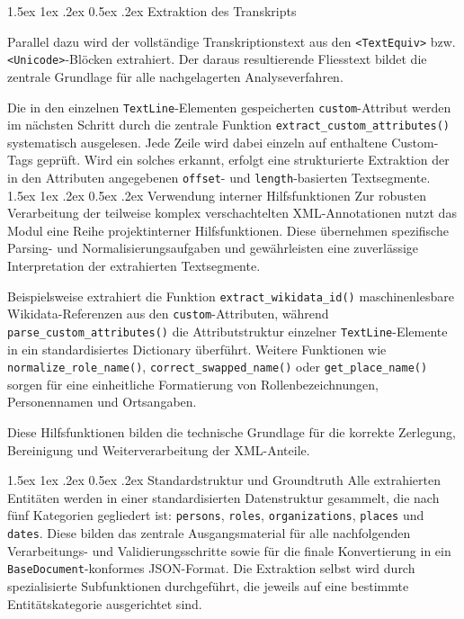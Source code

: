 \documentclass[12pt, a4paper, ngerman, bidi=default]{article}
\makeatletter
\newcommand{\code}[1]{\colorbox{VeryLightGray}{\texttt{#1}}} %
\let\oldparagraph\paragraph%
\renewcommand{\paragraph}{
    \@ifstar%
      \xxxParagraphStar%
      \xxxParagraphNoStar%
 }
\newcommand{\xxxParagraphStar}[1]{\oldparagraph*{#1}\mbox{}}
\newcommand{\xxxParagraphNoStar}[1]{\oldparagraph{#1}\mbox{}}
\renewcommand\paragraph{\@startsection{paragraph}{4}{0em}%
  {1.5ex \@plus1ex \@minus.2ex}%
  {0.5ex \@plus.2ex}%
  {\normalfont\normalsize\bfseries\itshape}}
\makeatother
\begin{document}
\paragraph{Extraktion des Transkripts}

Parallel dazu wird der vollständige Transkriptionstext aus den \code{<TextEquiv>} bzw. \code{<Unicode>}-Blöcken extrahiert. Der daraus resultierende Fliesstext bildet die zentrale Grundlage für alle nachgelagerten Analyseverfahren. 

Die in den einzelnen \code{TextLine}-Elementen gespeicherten \code{custom}-Attribut   werden im nächsten Schritt durch die zentrale Funktion \code{extract\_custom\_attributes()} systematisch ausgelesen. Jede Zeile wird dabei einzeln auf enthaltene Custom-Tags geprüft. Wird ein solches erkannt, erfolgt eine strukturierte Extraktion der in den Attributen angegebenen \code{offset}- und \code{length}-basierten Textsegmente.
\paragraph{Verwendung interner Hilfsfunktionen}
Zur robusten Verarbeitung der teilweise komplex verschachtelten XML-Annotationen nutzt das Modul eine Reihe projektinterner Hilfsfunktionen. Diese übernehmen spezifische Parsing- und Normalisierungsaufgaben und gewährleisten eine zuverlässige Interpretation der extrahierten Textsegmente.

Beispielsweise extrahiert die Funktion \code{extract\_wikidata\_id()} maschinenlesbare Wikidata-Referenzen aus den \code{custom}-Attributen, während \code{parse\_custom\_attributes()} die Attributstruktur einzelner \code{TextLine}-Elemente in ein standardisiertes Dictionary überführt. Weitere Funktionen wie \code{normalize\_role\_name()}, \code{correct\_swapped\_name()} oder \code{get\_place\_name()} sorgen für eine einheitliche Formatierung von Rollenbezeichnungen, Personennamen und Ortsangaben.

Diese Hilfsfunktionen bilden die technische Grundlage für die korrekte Zerlegung, Bereinigung und Weiterverarbeitung der XML-Anteile.

\paragraph{Standardstruktur und Groundtruth}
Alle extrahierten Entitäten werden in einer standardisierten Datenstruktur gesammelt, die nach fünf Kategorien gegliedert ist: \code{persons}, \code{roles}, \code{organizations}, \code{places} und \code{dates}. Diese bilden das zentrale Ausgangsmaterial für alle nachfolgenden Verarbeitungs- und Validierungsschritte sowie für die finale Konvertierung in ein \code{BaseDocument}-konformes JSON-Format. Die Extraktion selbst wird durch spezialisierte Subfunktionen durchgeführt, die jeweils auf eine bestimmte Entitätskategorie ausgerichtet sind.
\end{document}
